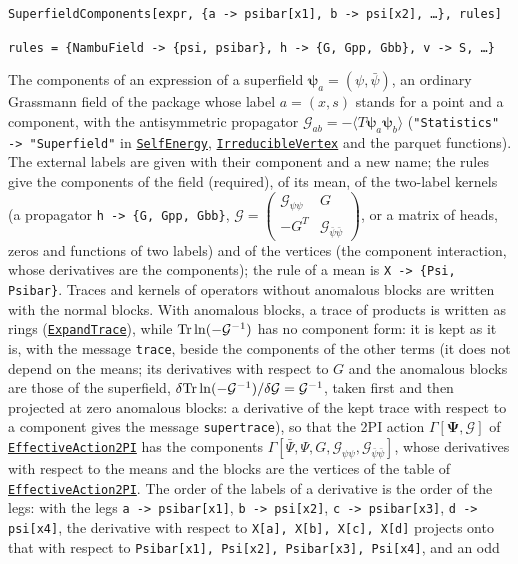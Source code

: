 \documentclass[11pt,a4paper]{article}
\makeatletter
\newcommand{\pkg}[1]{\texttt{#1}}
\newenvironment{function}[1]{\par\if@nobreak\else\medskip\needspace{4\baselineskip}\fi\noindent\phantomsection\label{fn:#1}%
  \begin{fnbox}}{\end{fnbox}\par\nobreak}
\newcommand{\syntax}[1]{\texttt{#1}\par}
\newcommand{\fnref}[1]{\hyperref[fn:#1]{\pkg{#1}}}
\makeatother
\begin{document}
\begin{function}{SuperfieldComponents}
\syntax{SuperfieldComponents[expr, \{a -> psibar[x1], b -> psi[x2], \dots\}, rules]}
\syntax{rules = \{NambuField -> \{psi, psibar\}, h -> \{G, Gpp, Gbb\}, v -> S, \dots\}}
\end{function}
The components of an expression of a superfield $\boldsymbol\psi_a=(\psi,\bar\psi)$, an ordinary Grassmann field of the
package whose label $a=(x,s)$ stands for a point and a component, with the antisymmetric propagator
$\mathcal G_{ab}=-\langle T\boldsymbol\psi_a\boldsymbol\psi_b\rangle$ (\pkg{"Statistics" -> "Superfield"} in
\fnref{SelfEnergy}, \fnref{IrreducibleVertex} and the parquet functions). The external labels are given with their component
and a new name; the rules give the components of the field (required), of its mean, of the two-label kernels (a propagator
\pkg{h -> \{G, Gpp, Gbb\}}, $\mathcal G=\left(\begin{smallmatrix}\mathcal G_{\psi\psi}&G\\-G^T&\mathcal G_{\bar\psi\bar\psi}\end{smallmatrix}\right)$,
or a matrix of heads, zeros and functions of two labels) and of the vertices (the component interaction, whose derivatives
are the components); the rule of a mean is \pkg{X -> \{Psi, Psibar\}}. Traces and kernels of operators without anomalous
blocks are written with the normal blocks. With anomalous blocks, a trace of products is written as rings
(\fnref{ExpandTrace}), while ${\rm Tr}\ln(-\mathcal G^{-1})$ has no component form: it is kept as it is, with the message
\pkg{trace}, beside the components of the other terms (it does not depend on the means; its derivatives with respect to
$G$ and the anomalous blocks are those of the superfield, $\delta{\rm Tr}\ln(-\mathcal G^{-1})/\delta\mathcal G=\mathcal G^{-1}$,
taken first and then projected at zero anomalous blocks: a derivative of the kept trace with respect to a component gives
the message \pkg{supertrace}), so that the 2PI action
$\Gamma[\boldsymbol\Psi,\mathcal G]$ of \fnref{EffectiveAction2PI} has the components $\Gamma[\bar\Psi,\Psi,G,\mathcal G_{\psi\psi},\mathcal
G_{\bar\psi\bar\psi}]$, whose derivatives with respect to the means and the blocks are the vertices of the table of
\fnref{EffectiveAction2PI}. The order of the labels of a derivative is the order of the legs: with the legs
\pkg{a -> psibar[x1]}, \pkg{b -> psi[x2]}, \pkg{c -> psibar[x3]}, \pkg{d -> psi[x4]}, the derivative with respect to
\pkg{X[a], X[b], X[c], X[d]} projects onto that with respect to \pkg{Psibar[x1], Psi[x2], Psibar[x3], Psi[x4]}, and an odd
\end{document}
